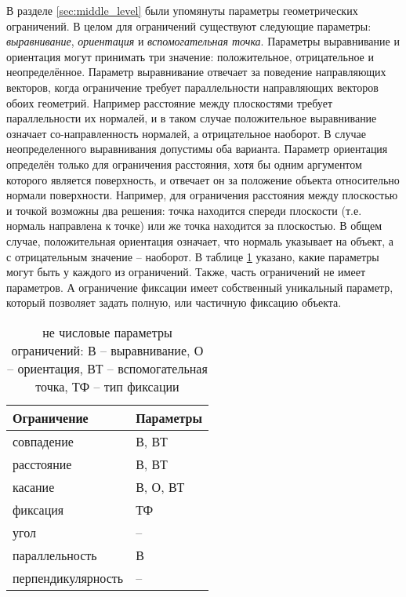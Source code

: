 В разделе \ref{sec:middle_level} были упомянуты параметры геометрических ограничений. В целом для ограничений существуют следующие параметры: \textit{выравнивание}, \textit{ориентация} и \textit{вспомогательная точка}. Параметры выравнивание и ориентация могут принимать три значение: положительное, отрицательное и неопределённое. Параметр выравнивание отвечает за поведение направляющих векторов, когда ограничение требует параллельности направляющих векторов обоих геометрий. Например расстояние между плоскостями требует параллельности их нормалей, и в таком случае положительное выравнивание означает со-направленность нормалей, а отрицательное наоборот. В случае неопределенного выравнивания допустимы оба варианта. Параметр ориентация определён только для ограничения расстояния, хотя бы одним аргументом которого является поверхность, и отвечает он за положение объекта относительно нормали поверхности. Например, для ограничения расстояния между плоскостью и точкой возможны два решения: точка находится спереди плоскости (т.е. нормаль направлена к точке) или же точка находится за плоскостью. В общем случае, положительная ориентация означает, что нормаль указывает на объект, а   с отрицательным значение -- наоборот. В таблице \ref{tab:constr_params} указано, какие параметры могут быть у каждого из ограничений. Также, часть ограничений не имеет параметров. А ограничение фиксации имеет собственный уникальный параметр, который позволяет задать полную, или частичную фиксацию объекта.   

\begin{table}[htbp]
    \renewcommand{\arraystretch}{1.4}
	\caption{не числовые параметры ограничений: В -- выравнивание, О -- ориентация, ВТ -- вспомогательная точка, ТФ -- тип фиксации}
	\label{tab:constr_params}
	\begin{tabularx}{\textwidth}{XX}
		\toprule
		\textbf{Ограничение} & \textbf{Параметры}\\
		\hline
		совпадение         & В, ВТ      \\ \hline
	    расстояние         & В, ВТ   \\ \hline
	    касание            & В, О, ВТ   \\ \hline
	    фиксация           & ТФ         \\ \hline
	    угол               & --         \\ \hline
	    параллельность     & В          \\ \hline
	    перпендикулярность & --         \\
	    \bottomrule
	\end{tabularx}
\end{table}


